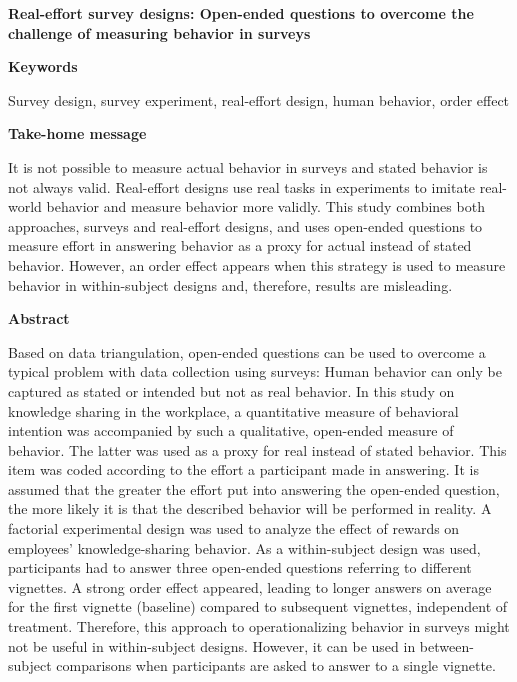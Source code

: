 \documentclass{article}
\begin{document}
  \textbf{Real-effort survey designs: Open-ended questions to overcome the challenge of measuring behavior in surveys}



\textbf{}

\textbf{Keywords}

Survey design, survey experiment, real-effort design, human behavior, order effect 

\textbf{}

\textbf{Take-home message}

It is not possible to measure actual behavior in surveys and stated behavior is not always valid. Real-effort designs use real tasks in experiments to imitate real-world behavior and measure behavior more validly. This study combines both approaches, surveys and real-effort designs, and uses open-ended questions to measure effort in answering behavior as a proxy for actual instead of stated behavior. However, an order effect appears when this strategy is used to measure behavior in within-subject designs and, therefore, results are misleading.

\textbf{}

\textbf{Abstract}

Based on data triangulation, open-ended questions can be used to overcome a typical problem with data collection using surveys: Human behavior can only be captured as stated or intended but not as real behavior. In this study on knowledge sharing in the workplace, a quantitative measure of behavioral intention was accompanied by such a qualitative, open-ended measure of behavior. The latter was used as a proxy for real instead of stated behavior. This item was coded according to the effort a participant made in answering. It is assumed that the greater the effort put into answering the open-ended question, the more likely it is that the described behavior will be performed in reality. A factorial experimental design was used to analyze the effect of rewards on employees' knowledge-sharing behavior. As a within-subject design was used, participants had to answer three open-ended questions referring to different vignettes. A strong order effect appeared, leading to longer answers on average for the first vignette (baseline) compared to subsequent vignettes, independent of treatment. Therefore, this approach to operationalizing behavior in surveys might not be useful in within-subject designs. However, it can be used in between-subject comparisons when participants are asked to answer to a single vignette.
\end{document}
